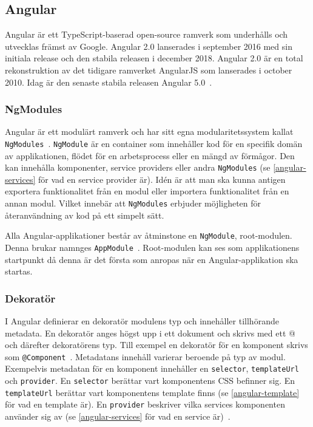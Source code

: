 
\subsection{Angular}
Angular är ett TypeScript-baserad open-source ramverk som underhålls och utvecklas främst av Google. Angular 2.0 lanserades i september 2016 med sin initiala release och den stabila releasen i december 2018. Angular 2.0 är en total rekonstruktion av det tidigare ramverket AngularJS som lanserades i october 2010. Idag är den senaste stabila releasen Angular 5.0~\cite{angular-date}.

\subsubsection{NgModules}
Angular är ett modulärt ramverk och har sitt egna modularitetssystem kallat \texttt{NgModules}~\cite{angular-architecture}. \texttt{NgModule} är en container som innehåller kod för en specifik domän av applikationen, flödet för en arbetsprocess eller en mängd av förmågor. Den kan innehålla komponenter, service providers eller andra \texttt{NgModules} (se \ref{angular-services} för vad en service provider är). Idén är att man ska kunna antigen exportera funktionalitet från en modul eller importera funktionalitet från en annan modul. Vilket innebär att \texttt{NgModules} erbjuder möjligheten för återanvändning av kod på ett simpelt sätt. 

Alla Angular-applikationer består av åtminstone en \texttt{NgModule}, root-modulen. Denna brukar namnges \texttt{AppModule}~\cite{angular-modules}. Root-modulen kan ses som applikationens startpunkt då denna är det första som anropas när en Angular-applikation ska startas.


\subsubsection{Dekoratör}
I Angular definierar en dekoratör modulens typ och innehåller tillhörande metadata. En dekoratör anges högst upp i ett dokument och skrivs med ett @ och därefter dekoratörens typ. Till exempel en dekoratör för en komponent skrivs som \texttt{@Component}~\cite{angular-modules}. Metadatans innehåll varierar beroende på typ av modul. Exempelvis metadatan för en komponent innehåller en \texttt{selector}, \texttt{templateUrl} och \texttt{provider}. En \texttt{selector} berättar vart komponentens CSS befinner sig. En \texttt{templateUrl} berättar vart komponentens template finns (se \ref{angular-template} för vad en template är). En \texttt{provider} beskriver vilka services komponenten använder sig av (se \ref{angular-services} för vad en service är)~\cite{angular-components}.


